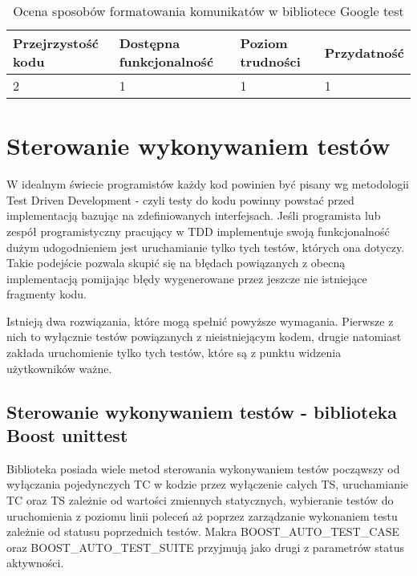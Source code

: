 \documentclass[12pt,a4paper,notitlepage]{report}
\begin{document}
\begin{center}
			\begin{table}[!ht]
			\caption{Ocena sposobów formatowania komunikatów w bibliotece Google test}
			\label{}
			\begin{tabular}[!hc]{|l|l|l|l|}
		\hline
		Przejrzystość kodu 	&	Dostępna funkcjonalność	&	Poziom trudności	&	Przydatność \\ \hline
		2					&	1						&	1					& 	1  			\\ \hline
			\end{tabular}
			\end{table} 
		\end{center}

\chapter{Sterowanie wykonywaniem testów}

W idealnym świecie programistów każdy kod powinien być pisany wg metodologii Test Driven Development - czyli testy do kodu powinny powstać przed implementacją bazując na zdefiniowanych interfejsach.
Jeśli programista lub zespół programistyczny pracujący w TDD implementuje swoją funkcjonalność dużym udogodnieniem jest uruchamianie tylko tych testów, których ona dotyczy. Takie podejście pozwala skupić się na błędach powiązanych z obecną implementacją pomijając błędy wygenerowane przez jeszcze nie istniejące fragmenty kodu.

Istnieją dwa rozwiązania, które mogą spełnić powyższe wymagania. Pierwsze z nich to wyłącznie testów powiązanych z nieistniejącym kodem, drugie natomiast zakłada uruchomienie tylko tych testów, które są z punktu widzenia użytkowników ważne.

\section{Sterowanie wykonywaniem testów - biblioteka Boost unittest}

Biblioteka posiada wiele metod sterowania wykonywaniem testów począwszy od wyłączania pojedynczych TC w kodzie przez wyłączenie całych TS, uruchamianie TC oraz TS zależnie od wartości zmiennych statycznych, wybieranie testów do uruchomienia z poziomu linii poleceń aż poprzez zarządzanie wykonaniem testu zależnie od statusu poprzednich testów.
Makra BOOST{\_}AUTO{\_}TEST{\_}CASE oraz BOOST{\_}AUTO{\_}TEST{\_}SUITE przyjmują jako drugi z parametrów status aktywności.
\end{document}
